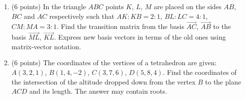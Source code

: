 \documentclass[]{exam}
\begin{document}
\begin{enumerate}





\item (6 points)   
In the triangle $ABC$ points $K$, $L$, $M$ are placed on the sides $AB$, $BC$ and $AC$ respectively such that $AK : KB = 2 : 1$, $BL : LC = 4 : 1$, $CM : MA = 3 : 1$. Find the transition matrix from the basis $\overrightarrow{AC}$, $\overrightarrow{AB}$ to the basis $\overrightarrow{ML}$, $\overrightarrow{KL}$. Express new basis vectors in terms of the old ones using matrix-vector notation.




\item (6 points) The coordinates of the vertices of a tetrahedron are given: $A(3,2,1)$, $B(1,4,-2)$, $C(3,7,6)$, $D(5,8,4)$. Find the coordinates of the intersection of the altitude dropped down from the vertex $B$ to the plane $ACD$ and its length. The answer may contain roots. 


\end{enumerate}
\end{document}

